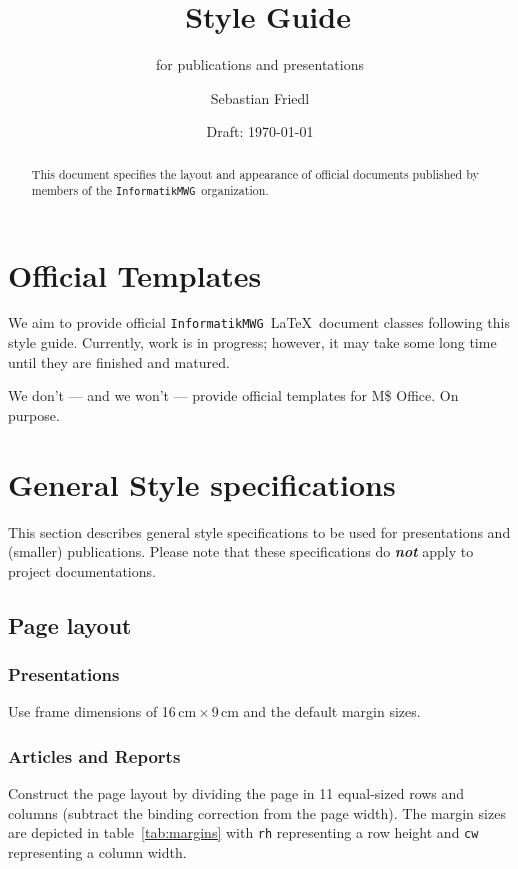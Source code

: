 \documentclass{InformatikMWGArticle}
\title{\informatikMWG\ Style Guide}
\subtitle{for publications and presentations}
\author{Sebastian Friedl}
\date{Draft: \today}
\def\informatikMWG{\texttt{InformatikMWG}}
\begin{document}
    \maketitle

    \begin{abstract}
        This document specifies the layout and appearance of official documents published by members of the \informatikMWG\ organization.
    \end{abstract}


    
    \section{Official Templates}
    We aim to provide official \informatikMWG\ \LaTeX\ document classes following this style guide. Currently, work is in progress; however, it may take some long time until they are finished and matured.

    \medskip
    We don't --- and we won't --- provide official templates for M\$ Office. On purpose.

    
    \section{General Style specifications}
    This section describes general style specifications to be used for presentations and (smaller) publications.
    Please note that these specifications do \emph{\textbf{not}} apply to project documentations.
    
    \subsection{Page layout}
    \subsubsection*{Presentations}
    Use frame dimensions of 16\,cm\,$\times$\,9\,cm and the default margin sizes.
    
    \subsubsection*{Articles and Reports}
    Construct the page layout by dividing the page in 11 equal-sized rows and columns (subtract the binding correction from the page width). The margin sizes are depicted in table~\ref{tab:margins} with \texttt{rh} representing a row height and \texttt{cw} representing a column width.
    
\end{document}
